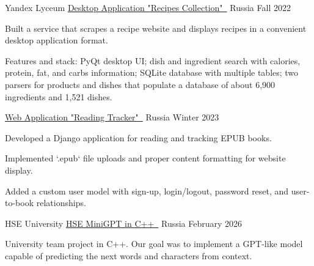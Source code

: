 

\begin{cventries}

\cventry
  {Yandex Lyceum} %
  {\href{https://github.com/mistmake/Recipes_collection.git}{Desktop Application "Recipes Collection"~\faGithubSquare}} %
  {Russia} %
  {Fall 2022} %
  {
    \begin{cvitems}
      \item {Built a service that scrapes a recipe website and displays recipes in a convenient desktop application format.}
      \item {Features and stack: PyQt desktop UI; dish and ingredient search with calories, protein, fat, and carbs information; SQLite database with multiple tables; two parsers for products and dishes that populate a database of about 6,900 ingredients and 1,521 dishes.}
    \end{cvitems}
  }
  \cventry
  {} %
  {\href{https://github.com/mistmake/Reading_tracker}{Web Application "Reading Tracker"~\faGithubSquare}}%
  {Russia} %
  {Winter 2023} %
  {
    \begin{cvitems}
      \item {Developed a Django application for reading and tracking EPUB books.}
      \item {Implemented `.epub` file uploads and proper content formatting for website display.}
      \item {Added a custom user model with sign-up, login/logout, password reset, and user-to-book relationships.}
    \end{cvitems}
  }
  \cventry
  {HSE University} %
  {\href{https://github.com/mistmake/HSE-project-Mini-GPT-cpp.git}{HSE MiniGPT in C++~\faGithubSquare}} %
  {Russia} %
  {February 2026} %
  {
    \begin{cvitems}
      \item {University team project in C++. Our goal was to implement a GPT-like model capable of predicting the next words and characters from context.}

\end{cvitems}}
\end{cventries}
